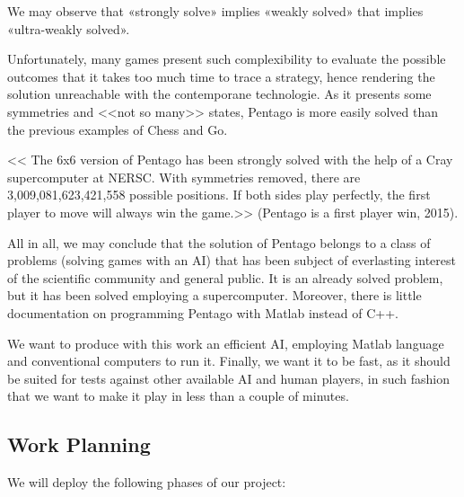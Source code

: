 \vspace{10pt}

We may observe that «strongly solve» implies «weakly solved» that implies «ultra-weakly solved». 

\vspace{10pt}

Unfortunately, many games present such complexibility to evaluate the possible
outcomes that it takes too much time to trace a strategy, hence rendering the
solution unreachable with the contemporane technologie. As it presents some
symmetries and <<not so many>> states, Pentago is more easily solved than the
previous examples of Chess and Go.

\vspace{10pt}

<< The 6x6 version of Pentago has been strongly solved with the help of a Cray
supercomputer at NERSC. With symmetries removed, there are
3,009,081,623,421,558 possible positions. If both sides play perfectly, the
first player to move will always win the game.>> (Pentago is a first player win,
2015).

\vspace{10pt}

All in all, we may conclude that the solution of Pentago belongs to a class of
problems (solving games with an AI) that has been subject of everlasting
interest of the scientific community and general public. It is an already
solved problem, but it has been solved employing a supercomputer. Moreover,
there is little documentation on programming Pentago with Matlab instead of C++.

\vspace{10pt}

We want to produce with this work an efficient AI, employing Matlab language
and conventional computers to run it. Finally, we want it to be fast, as it
should be suited for tests against other available AI and human players, in
such fashion that we want to make it play in less than a couple of minutes.

\subsection{Work Planning}

We will deploy the following phases of our project:

